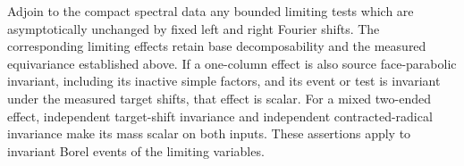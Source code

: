 \begin{lemma}
\label{lem:links-invariant-variables}
Adjoin to the compact spectral data any bounded limiting tests which
are asymptotically unchanged by fixed left and right Fourier shifts.
The corresponding limiting effects retain base decomposability and
the measured equivariance established above. If a one-column effect
is also source face-parabolic invariant, including its inactive
simple factors, and its event or test is invariant under the
measured target shifts, that effect is scalar. For a mixed
two-ended effect, independent target-shift invariance and
independent contracted-radical invariance make its mass scalar
on both inputs. These assertions apply to invariant Borel events
of the limiting variables.
\end{lemma}

